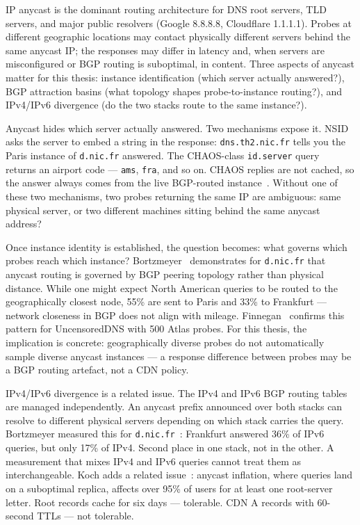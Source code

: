 \ac{IP} anycast is the dominant routing architecture for \ac{DNS} root servers, \ac{TLD} servers, and major public resolvers (Google 8.8.8.8, Cloudflare 1.1.1.1). Probes at different geographic locations may contact physically different servers behind the same anycast \ac{IP}; the responses may differ in latency and, when servers are misconfigured or \ac{BGP} routing is suboptimal, in content. Three aspects of anycast matter for this thesis: instance identification (which server actually answered?), \ac{BGP} attraction basins (what topology shapes probe-to-instance routing?), and \ac{IPv4}/\ac{IPv6} divergence (do the two stacks route to the same instance?).

Anycast hides which server actually answered. Two mechanisms expose it. \ac{NSID}~\cite{RFC5001} asks the server to embed a string in the response: \texttt{dns.th2.nic.fr} tells you the Paris instance of \texttt{d.nic.fr} answered. The CHAOS-class \texttt{id.server} query~\cite{RFC4892} returns an airport code — \texttt{ams}, \texttt{fra}, and so on. CHAOS replies are not cached, so the answer always comes from the live \ac{BGP}-routed instance~\cite{Finnegan2018}. Without one of these two mechanisms, two probes returning the same \ac{IP} are ambiguous: same physical server, or two different machines sitting behind the same anycast address?

Once instance identity is established, the question becomes: what governs which probes reach which instance? Bortzmeyer~\cite{Bortzmeyer2013} demonstrates for \texttt{d.nic.fr} that anycast routing is governed by \ac{BGP} peering topology rather than physical distance. While one might expect North American queries to be routed to the geographically closest node, 55\% are sent to Paris and 33\% to Frankfurt — network closeness in \ac{BGP} does not align with mileage. Finnegan~\cite{Finnegan2018} confirms this pattern for UncensoredDNS with 500 Atlas probes. For this thesis, the implication is concrete: geographically diverse probes do not automatically sample diverse anycast instances — a response difference between probes may be a \ac{BGP} routing artefact, not a \ac{CDN} policy.

\ac{IPv4}/\ac{IPv6} divergence is a related issue. The IPv4 and IPv6 \ac{BGP} routing tables are managed independently. An anycast prefix announced over both stacks can resolve to different physical servers depending on which stack carries the query. Bortzmeyer measured this for \texttt{d.nic.fr}~\cite{Bortzmeyer2013}: Frankfurt answered 36\% of IPv6 queries, but only 17\% of IPv4. Second place in one stack, not in the other. A measurement that mixes IPv4 and IPv6 queries cannot treat them as interchangeable. Koch adds a related issue~\cite{Koch2021}: anycast inflation, where queries land on a suboptimal replica, affects over 95\% of users for at least one root-server letter. Root records cache for six days — tolerable. CDN A records with 60-second TTLs — not tolerable.

